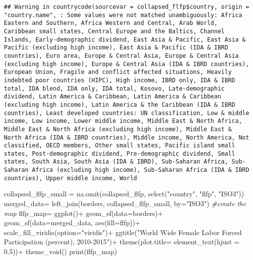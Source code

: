\documentclass[
]{article}
\newenvironment{Shaded}{\begin{snugshade}}{\end{snugshade}}
\newcommand{\AttributeTok}[1]{\textcolor[rgb]{0.77,0.63,0.00}{#1}}
\newcommand{\CommentTok}[1]{\textcolor[rgb]{0.56,0.35,0.01}{\textit{#1}}}
\newcommand{\FloatTok}[1]{\textcolor[rgb]{0.00,0.00,0.81}{#1}}
\newcommand{\FunctionTok}[1]{\textcolor[rgb]{0.00,0.00,0.00}{#1}}
\newcommand{\NormalTok}[1]{#1}
\newcommand{\OtherTok}[1]{\textcolor[rgb]{0.56,0.35,0.01}{#1}}
\newcommand{\SpecialCharTok}[1]{\textcolor[rgb]{0.00,0.00,0.00}{#1}}
\newcommand{\StringTok}[1]{\textcolor[rgb]{0.31,0.60,0.02}{#1}}
\begin{document}
\begin{verbatim}
## Warning in countrycode(sourcevar = collapsed_flfp$country, origin = "country.name", : Some values were not matched unambiguously: Africa Eastern and Southern, Africa Western and Central, Arab World, Caribbean small states, Central Europe and the Baltics, Channel Islands, Early-demographic dividend, East Asia & Pacific, East Asia & Pacific (excluding high income), East Asia & Pacific (IDA & IBRD countries), Euro area, Europe & Central Asia, Europe & Central Asia (excluding high income), Europe & Central Asia (IDA & IBRD countries), European Union, Fragile and conflict affected situations, Heavily indebted poor countries (HIPC), High income, IBRD only, IDA & IBRD total, IDA blend, IDA only, IDA total, Kosovo, Late-demographic dividend, Latin America & Caribbean, Latin America & Caribbean (excluding high income), Latin America & the Caribbean (IDA & IBRD countries), Least developed countries: UN classification, Low & middle income, Low income, Lower middle income, Middle East & North Africa, Middle East & North Africa (excluding high income), Middle East & North Africa (IDA & IBRD countries), Middle income, North America, Not classified, OECD members, Other small states, Pacific island small states, Post-demographic dividend, Pre-demographic dividend, Small states, South Asia, South Asia (IDA & IBRD), Sub-Saharan Africa, Sub-Saharan Africa (excluding high income), Sub-Saharan Africa (IDA & IBRD countries), Upper middle income, World
\end{verbatim}

\begin{Shaded}
\begin{Highlighting}[]
\NormalTok{collapsed\_flfp\_small }\OtherTok{=} \FunctionTok{na.omit}\NormalTok{(collapsed\_flfp, }\FunctionTok{select}\NormalTok{(}\StringTok{"country"}\NormalTok{, }\StringTok{"flfp"}\NormalTok{, }\StringTok{"ISO3"}\NormalTok{))}
\NormalTok{merged\_data}\OtherTok{=} \FunctionTok{left\_join}\NormalTok{(borders, collapsed\_flfp\_small, }\AttributeTok{by=}\StringTok{"ISO3"}\NormalTok{)}
\CommentTok{\#create the map}
\NormalTok{flfp\_map}\OtherTok{=} \FunctionTok{ggplot}\NormalTok{()}\SpecialCharTok{+}
  \FunctionTok{geom\_sf}\NormalTok{(}\AttributeTok{data=}\NormalTok{borders)}\SpecialCharTok{+}
  \FunctionTok{geom\_sf}\NormalTok{(}\AttributeTok{data=}\NormalTok{merged\_data, }\FunctionTok{aes}\NormalTok{(}\AttributeTok{fill=}\NormalTok{flfp))}\SpecialCharTok{+}
  \FunctionTok{scale\_fill\_viridis}\NormalTok{(}\AttributeTok{option=}\StringTok{"viridis"}\NormalTok{)}\SpecialCharTok{+}
  \FunctionTok{ggtitle}\NormalTok{(}\StringTok{"World Wide Female Labor Forced Participation (percent), 2010{-}2015"}\NormalTok{)}\SpecialCharTok{+}
  \FunctionTok{theme}\NormalTok{(}\AttributeTok{plot.title=} \FunctionTok{element\_text}\NormalTok{(}\AttributeTok{hjust =} \FloatTok{0.5}\NormalTok{))}\SpecialCharTok{+}
  \FunctionTok{theme\_void}\NormalTok{()}
\FunctionTok{print}\NormalTok{(flfp\_map)}
\end{Highlighting}
\end{Shaded}
\end{document}
